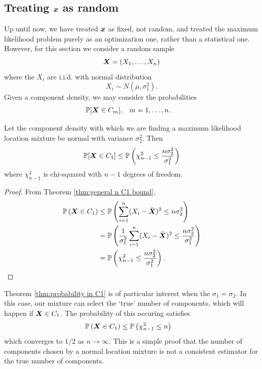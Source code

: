 	\subsection{Treating \texorpdfstring{${\bm{{x}}}$}{x} as random}

		Up until now, we have treated ${\bm{{x}}}$ as fixed, not random, and treated the maximum likelihood problem purely as an optimization one, rather than a statistical one. However, for this section we consider a random sample
		\begin{equation}
			{\bm{{X}}} = (X_1, \dots, X_n)
		\end{equation}
		where the $X_i$ are i.i.d. with normal distribution 
		\begin{equation}
			X_i \sim N(\mu, \sigma_1^2).
		\end{equation}
		Given a component density, we may consider the probabilities
		\begin{align}
			&\mathbb{P}[{\bm{{X}}} \in C_m],	&&m = 1,\dots,n.
		\end{align}
		
		\begin{theorem}
		\label{thm:probability in C1}
			Let the component density with which we are finding a maximum likelihood location mixture be normal with variance $\sigma_2^2$. Then 
			\begin{equation}
				\mathbb{P}[{\bm{{X}}} \in C_1] \leq \mathbb{P}\left(\chi_{n-1}^2 \leq \frac{n \sigma_2^2}{\sigma_1^2}\right)
			\end{equation}
			where $\chi_{n-1}^2$ is chi-squared with $n-1$ degrees of freedom.
		\end{theorem}
		\begin{proof}
			From Theorem \ref{thm:general n C1 bound},
			\begin{align}
			\mathbb{P}\left({\bm{{X}}} \in C_1 \right) &\leq \mathbb{P} \left( \sum_{i=1}^n (X_i - \bar{{\bm{{X}}}})^2 \leq n \sigma_2^2  \right) \\
				&= \mathbb{P}\left( \frac{1}{\sigma_1^2}\sum_{i=1}^n (X_i - \bar{{\bm{{X}}}})^2 \leq \frac{n \sigma_2^2}{\sigma_1^2}\right)\\
				&= \mathbb{P}\left(\chi_{n-1}^2  \leq \frac{n \sigma_2^2}{\sigma_1^2} \right).
			\end{align}
		\end{proof}

		Theorem \ref{thm:probability in C1} is of particular interest when the $\sigma_1 = \sigma_2$. In this case, our mixture can select the `true' number of components, which will happen if ${\bm{{X}}} \in C_1$. The probability of this occuring satisfies
		\begin{align}
			\mathbb{P}\left({\bm{{X}}} \in C_1\right) &\leq \mathbb{P}\left(\chi_{n-1}^2 \leq n\right)
		\end{align}
		which converges to $1/2$ as $n \rightarrow \infty$. This is a simple proof that the number of components chosen by a normal location mixture is not a consistent estimator for the true number of components.

